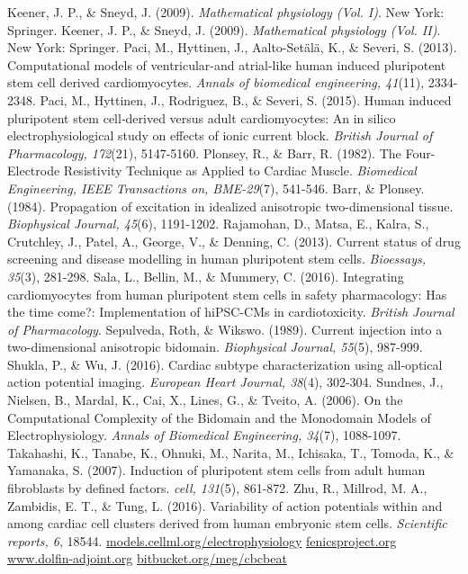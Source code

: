 \documentclass[12pt,a4paper]{article}
\begin{document}
\begin{thebibliography}{99}
 Keener, J. P., \& Sneyd, J. (2009). \textit{Mathematical physiology (Vol. I)}. New York: Springer.
 Keener, J. P., \& Sneyd, J. (2009). \textit{Mathematical physiology (Vol. II)}. New York: Springer.
 Paci, M., Hyttinen, J., Aalto-Set\"al\"a, K., \& Severi, S. (2013). Computational models of ventricular-and atrial-like human induced pluripotent stem cell derived cardiomyocytes. \textit{Annals of biomedical engineering, 41}(11), 2334-2348.
 Paci, M., Hyttinen, J., Rodriguez, B., \& Severi, S. (2015). Human induced pluripotent stem cell‐derived versus adult cardiomyocytes: An in silico electrophysiological study on effects of ionic current block. \textit{British Journal of Pharmacology, 172}(21), 5147-5160.
 Plonsey, R., \& Barr, R. (1982). The Four-Electrode Resistivity Technique as Applied to Cardiac Muscle. \textit{Biomedical Engineering, IEEE Transactions on, BME-29}(7), 541-546.
 Barr, \& Plonsey. (1984). Propagation of excitation in idealized anisotropic two-dimensional tissue. \textit{Biophysical Journal, 45}(6), 1191-1202.
 Rajamohan, D., Matsa, E., Kalra, S., Crutchley, J., Patel, A., George, V., \& Denning, C. (2013). Current status of drug screening and disease modelling in human pluripotent stem cells. \textit{Bioessays, 35}(3), 281-298.
 Sala, L., Bellin, M., \& Mummery, C. (2016). Integrating cardiomyocytes from human pluripotent stem cells in safety pharmacology: Has the time come?: Implementation of hiPSC-CMs in cardiotoxicity. \textit{British Journal of Pharmacology}.
 Sepulveda, Roth, \& Wikswo. (1989). Current injection into a two-dimensional anisotropic bidomain. \textit{Biophysical Journal, 55}(5), 987-999.
 Shukla, P., \& Wu, J. (2016). Cardiac subtype characterization using all-optical action potential imaging. \textit{European Heart Journal, 38}(4), 302-304.
 Sundnes, J., Nielsen, B., Mardal, K., Cai, X., Lines, G., \& Tveito, A. (2006). On the Computational Complexity of the Bidomain and the Monodomain Models of Electrophysiology. \textit{Annals of Biomedical Engineering, 34}(7), 1088-1097.
 Takahashi, K., Tanabe, K., Ohnuki, M., Narita, M., Ichisaka, T., Tomoda, K., \& Yamanaka, S. (2007). Induction of pluripotent stem cells from adult human fibroblasts by defined factors. \textit{cell, 131}(5), 861-872.
 Zhu, R., Millrod, M. A., Zambidis, E. T., \& Tung, L. (2016). Variability of action potentials within and among cardiac cell clusters derived from human embryonic stem cells. \textit{Scientific reports, 6}, 18544.
 \url{models.cellml.org/electrophysiology}
 \url{fenicsproject.org}
 \url{www.dolfin-adjoint.org}
 \url{bitbucket.org/meg/cbcbeat}
\end{thebibliography}
%
\end{document}
